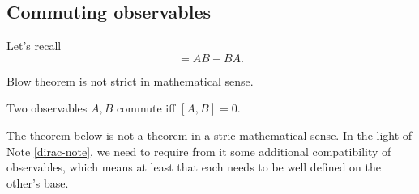 \documentclass[main.tex]{subfiles}
\begin{document}
\subsection{Commuting observables}

Let's recall
\begin{equation}
[A, B] = AB - BA.
\end{equation}

Blow theorem is not strict in mathematical sense.

\begin{definition}
Two observables $A, B$ commute iff $[A, B] = 0$.
\end{definition}

The theorem below is not a theorem in a stric mathematical sense. In the light of Note \ref{dirac-note}, we need to require from it some additional compatibility of observables, which means at least that each needs to be well defined on the other's base.
\end{document}
